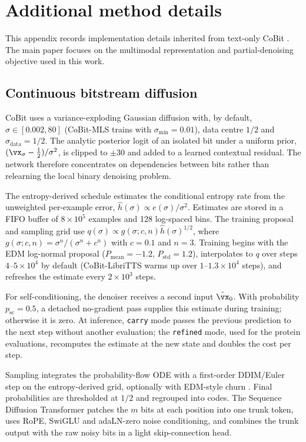 \section{Additional method details}
\label{app:method}

This appendix records implementation details inherited from text-only CoBit
\citep{method:cobit}. The main paper focuses on the multimodal representation and partial-denoising
objective used in this work.

\subsection{Continuous bitstream diffusion}

CoBit uses a variance-exploding Gaussian diffusion with, by default,
$\sigma\in[0.002,80]$ (CoBit-MLS trains with $\sigma_\text{min}=0.01$), data centre $1/2$ and $\sigma_{\mathrm{data}}=1/2$. The analytic posterior
logit of an isolated bit under a uniform prior,
$(\vx_\sigma-\tfrac12)/\sigma^2$, is clipped to $\pm30$ and added to a learned contextual
residual. The network therefore concentrates on dependencies between bits rather than relearning
the local binary denoising problem.

The entropy-derived schedule estimates the conditional entropy rate from the unweighted
per-example error, $\hat h(\sigma)\propto e(\sigma)/\sigma^2$. Estimates are stored in a FIFO buffer
of $8\times10^5$ examples and 128 log-spaced bins. The training proposal and sampling grid use
$q(\sigma)\propto g(\sigma;c,n)\hat h(\sigma)^{1/2}$, where
$g(\sigma;c,n)=\sigma^n/(\sigma^n+c^n)$ with $c=0.1$ and $n=3$. Training begins with the EDM
log-normal proposal ($P_{\mathrm{mean}}=-1.2$, $P_{\mathrm{std}}=1.2$), interpolates to $q$ over
steps $4$--$5\times10^4$ by default (CoBit-LibriTTS warms up over $1$--$1.3\times10^4$ steps), and refreshes the estimate every $2\times10^3$ steps.

For self-conditioning, the denoiser receives a second input $\hat\vx_0$. With probability
$p_{\mathrm{sc}}=0.5$, a detached no-gradient pass supplies this estimate during training;
otherwise it is zero. At inference, \texttt{carry} mode passes the previous prediction to the next
step without another evaluation; the \texttt{refined} mode, used for the protein evaluations, recomputes the estimate
at the new state and doubles the cost per step.

Sampling integrates the probability-flow ODE with a first-order DDIM/Euler step on the
entropy-derived grid, optionally with EDM-style churn \citep{method:ddim,image:edm}. Final
probabilities are thresholded at $1/2$ and regrouped into codes. The Sequence Diffusion Transformer
patches the $m$ bits at each position into one trunk token, uses RoPE, SwiGLU and adaLN-zero noise
conditioning, and combines the trunk output with the raw noisy bits in a light skip-connection
head.

